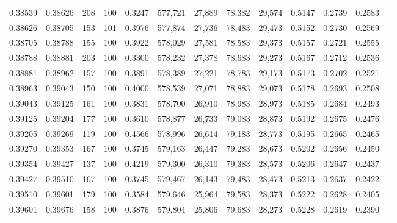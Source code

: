 \begin{tabular}{rrrrrrrrrrrrr}
0.38539 & 0.38626 &   208 & 100 &                                     0.3247 & 577,721 &  27,889 &  78,382 &  29,574 & 0.5147 & 0.2739 & 0.2583 \\
0.38626 & 0.38705 &   153 & 101 &                                     0.3976 & 577,874 &  27,736 &  78,483 &  29,473 & 0.5152 & 0.2730 & 0.2569 \\
0.38705 & 0.38788 &   155 & 100 &                                     0.3922 & 578,029 &  27,581 &  78,583 &  29,373 & 0.5157 & 0.2721 & 0.2555 \\
0.38788 & 0.38881 &   203 & 100 &                                     0.3300 & 578,232 &  27,378 &  78,683 &  29,273 & 0.5167 & 0.2712 & 0.2536 \\
0.38881 & 0.38962 &   157 & 100 &                                     0.3891 & 578,389 &  27,221 &  78,783 &  29,173 & 0.5173 & 0.2702 & 0.2521 \\
0.38963 & 0.39043 &   150 & 100 &                                     0.4000 & 578,539 &  27,071 &  78,883 &  29,073 & 0.5178 & 0.2693 & 0.2508 \\
0.39043 & 0.39125 &   161 & 100 &                                     0.3831 & 578,700 &  26,910 &  78,983 &  28,973 & 0.5185 & 0.2684 & 0.2493 \\
0.39125 & 0.39204 &   177 & 100 &                                     0.3610 & 578,877 &  26,733 &  79,083 &  28,873 & 0.5192 & 0.2675 & 0.2476 \\
0.39205 & 0.39269 &   119 & 100 &                                     0.4566 & 578,996 &  26,614 &  79,183 &  28,773 & 0.5195 & 0.2665 & 0.2465 \\
0.39270 & 0.39353 &   167 & 100 &                                     0.3745 & 579,163 &  26,447 &  79,283 &  28,673 & 0.5202 & 0.2656 & 0.2450 \\
0.39354 & 0.39427 &   137 & 100 &                                     0.4219 & 579,300 &  26,310 &  79,383 &  28,573 & 0.5206 & 0.2647 & 0.2437 \\
0.39427 & 0.39510 &   167 & 100 &                                     0.3745 & 579,467 &  26,143 &  79,483 &  28,473 & 0.5213 & 0.2637 & 0.2422 \\
0.39510 & 0.39601 &   179 & 100 &                                     0.3584 & 579,646 &  25,964 &  79,583 &  28,373 & 0.5222 & 0.2628 & 0.2405 \\
0.39601 & 0.39676 &   158 & 100 &                                     0.3876 & 579,804 &  25,806 &  79,683 &  28,273 & 0.5228 & 0.2619 & 0.2390 \\

\end{tabular}
